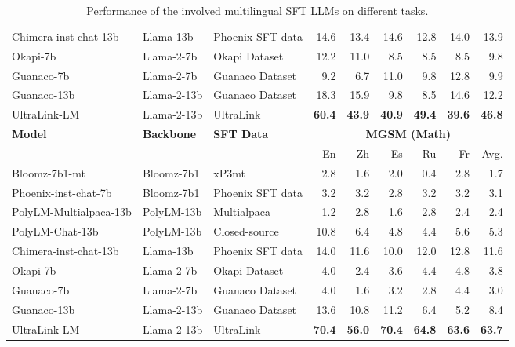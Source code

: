 \documentclass[11pt]{article}
\begin{document}
\begin{table*}[t]
\begin{tabular}{l l l rrrrrr }
     Chimera-inst-chat-13b & Llama-13b & Phoenix SFT data & 14.6 & 13.4 & 14.6 & 12.8 & 14.0 & 13.9 \\
     Okapi-7b &  Llama-2-7b &  Okapi Dataset & 12.2 & 11.0 & 8.5 & 8.5 & 8.5 & 9.8 \\
     Guanaco-7b & Llama-2-7b & Guanaco Dataset & 9.2 & 6.7 & 11.0 & 9.8 & 12.8 & 9.9 \\
     Guanaco-13b & Llama-2-13b & Guanaco Dataset & 18.3 & 15.9 & 9.8 & 8.5 & 14.6 & 12.2 \\
     \cmidrule(lr){1-1} \cmidrule(lr){2-2} \cmidrule(lr){3-3} \cmidrule(lr){4-9} 
     UltraLink-LM & Llama-2-13b & UltraLink & \bf 60.4 & \bf 43.9 & \bf 40.9 & \bf 49.4 & \bf 39.6 & \bf 46.8  \\
    \midrule
        \multirow{2}{*}{\bf Model} &  \multirow{2}{*}{\bf Backbone} & \multirow{2}{*}{\bf SFT Data} & \multicolumn{6}{c}{{\bf MGSM (Math)}}  \\
    \cmidrule(lr){4-9}
    & & & En & Zh & Es & Ru & Fr & Avg. \\
    \midrule
     Bloomz-7b1-mt & Bloomz-7b1 & xP3mt & 2.8 & 1.6 & 2.0 & 0.4 & 2.8 & 1.7 \\
     Phoenix-inst-chat-7b & Bloomz-7b1 & Phoenix SFT data & 3.2 & 3.2 & 2.8 & 3.2 & 3.2 & 3.1 \\
     PolyLM-Multialpaca-13b & PolyLM-13b & Multialpaca & 1.2 & 2.8 & 1.6 & 2.8 & 2.4 & 2.4 \\
     PolyLM-Chat-13b & PolyLM-13b & Closed-source & 10.8 & 6.4 & 4.8 & 4.4 & 5.6 & 5.3 \\
     Chimera-inst-chat-13b & Llama-13b & Phoenix SFT data & 14.0 & 11.6 & 10.0 & 12.0 & 12.8 & 11.6 \\
     Okapi-7b &  Llama-2-7b &  Okapi Dataset & 4.0 & 2.4 & 3.6 & 4.4 & 4.8 & 3.8 \\
     Guanaco-7b & Llama-2-7b & Guanaco Dataset & 4.0 & 1.6 & 3.2 & 2.8 & 4.4 & 3.0 \\
     Guanaco-13b & Llama-2-13b & Guanaco Dataset & 13.6 & 10.8 & 11.2 & 6.4 & 5.2 & 8.4 \\
     \cmidrule(lr){1-1} \cmidrule(lr){2-2} \cmidrule(lr){3-3} \cmidrule(lr){4-9} 
     UltraLink-LM & Llama-2-13b & UltraLink & \bf 70.4 & \bf 56.0 & \bf 70.4 & \bf 64.8 & \bf 63.6 & \bf 63.7  \\
    \bottomrule
  \end{tabular}
\caption{Performance of the involved multilingual SFT LLMs on different tasks.}
\label{tab: LLM_scores}
\end{table*}
\end{document}
